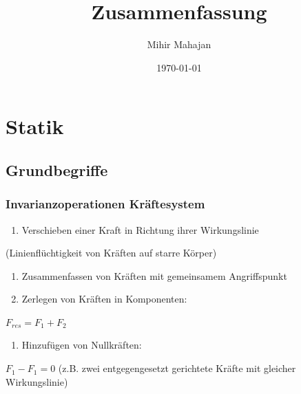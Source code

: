 \documentclass[11pt]{article}
\author{Mihir Mahajan}
\date{\today}
\title{Zusammenfassung}
\begin{document}
\maketitle
\tableofcontents


\section{Statik}
\label{sec:orgb323c77}
\subsection{Grundbegriffe}
\label{sec:org96b79e4}

\subsubsection{Invarianzoperationen Kräftesystem}
\label{sec:org2ca1f1d}
\begin{enumerate}
\item Verschieben einer Kraft in Richtung ihrer Wirkungslinie
\end{enumerate}
(Linienflüchtigkeit von Kräften auf starre Körper)
\begin{enumerate}
\item Zusammenfassen von Kräften mit gemeinsamem Angriffspunkt
\item Zerlegen von Kräften in Komponenten:
\end{enumerate}
\(F_{res} = F_1 + F_2\)
\begin{enumerate}
\item Hinzufügen von Nullkräften:
\end{enumerate}
\(F_1 - F_1 = 0\)
(z.B. zwei entgegengesetzt gerichtete Kräfte mit gleicher Wirkungslinie)
\end{document}

